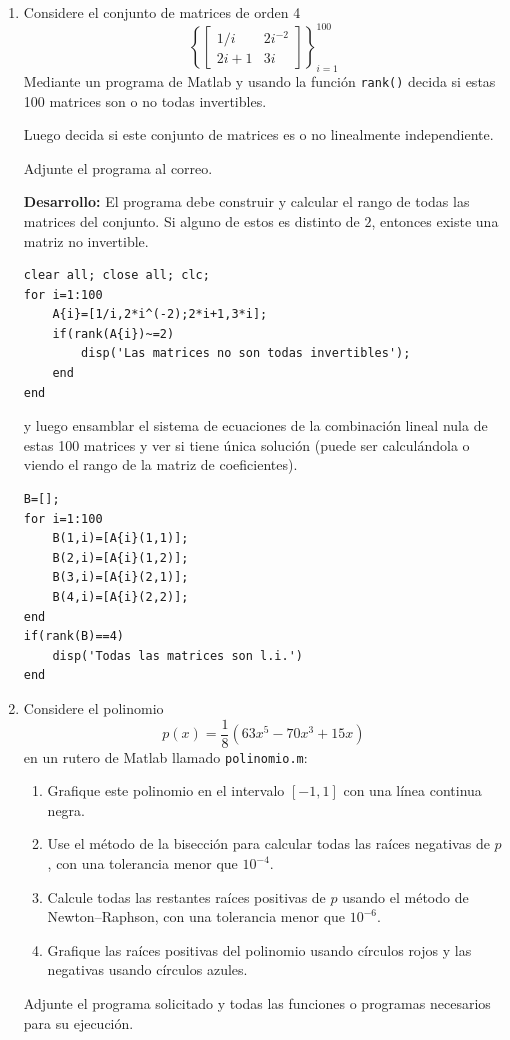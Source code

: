 \documentclass[letter,11pt]{article}
\newcommand{\matlab}{{\sc Matlab} }
\begin{document}
\begin{enumerate}
\item Considere el conjunto de matrices de orden 4
$$
\left\{
\begin{bmatrix}
1/i & 2i^{-2} \\
2i+1 & 3i
\end{bmatrix}
\right\}
_{i=1}^{100}
$$
Mediante un programa de \matlab y usando la funci\'on \texttt{rank()} decida si estas 100 matrices son o no todas invertibles.

Luego decida si este conjunto de matrices es o no linealmente independiente.

Adjunte el programa al correo. 

\textbf{Desarrollo:} 
El programa debe construir y calcular el rango de todas las matrices del conjunto. Si alguno de estos es distinto de $2$, entonces existe una matriz no invertible.
\begin{lstlisting}
clear all; close all; clc;
for i=1:100
	A{i}=[1/i,2*i^(-2);2*i+1,3*i];
    if(rank(A{i})~=2)
    	disp('Las matrices no son todas invertibles');
    end
end
\end{lstlisting}

y luego ensamblar el sistema de ecuaciones de la combinaci\'on lineal nula de estas 100 matrices y ver si tiene \'unica soluci\'on (puede ser calcul\'andola o viendo el rango de la matriz de coeficientes).
\begin{lstlisting}
B=[];
for i=1:100
    B(1,i)=[A{i}(1,1)];
    B(2,i)=[A{i}(1,2)];
    B(3,i)=[A{i}(2,1)];
    B(4,i)=[A{i}(2,2)];
end
if(rank(B)==4)
    disp('Todas las matrices son l.i.')
end
\end{lstlisting}
\item 
Considere el polinomio
$$
p(x)=\frac{1}{8}\left(63x^5-70x^3+15x\right)
$$
en un rutero de \matlab llamado \texttt{polinomio.m}:
\begin{enumerate}
\item Grafique este polinomio en el intervalo $[-1,1]$ con una l\'inea continua negra.
\item Use el m\'etodo de la bisecci\'on para calcular todas las ra\'ices negativas de $p$, con una tolerancia menor que $10^{-4}$.
\item Calcule todas las restantes ra\'ices positivas de $p$ usando el m\'etodo de Newton--Raphson, con una tolerancia menor que $10^{-6}$.
\item Grafique las ra\'ices  positivas del polinomio usando c\'irculos rojos y las negativas usando c\'irculos azules.
\end{enumerate}
Adjunte el programa solicitado y todas las funciones o programas necesarios para su ejecuci\'on.


\end{enumerate}
\end{document}
